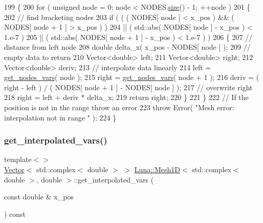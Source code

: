 \begin{DoxyCode}
199   \{
200     \textcolor{keywordflow}{for} ( \textcolor{keywordtype}{unsigned} node = 0; node < NODES.\hyperlink{classLuna_1_1Vector_ac9b6ed7a0df401728f27c193fbc8f4d8}{size}() - 1; ++node )
201     \{
202       \textcolor{comment}{// find bracketing nodes}
203       \textcolor{keywordflow}{if} ( ( ( NODES[ node ] < x\_pos ) && ( NODES[ node + 1 ] > x\_pos ) )
204               ||  ( std::abs( NODES[ node ] - x\_pos ) < 1.e-7  )
205               || ( std::abs( NODES[ node + 1 ] - x\_pos ) < 1.e-7 ) )
206       \{
207         \textcolor{comment}{// distance from left node}
208         \textcolor{keywordtype}{double} delta\_x( x\_pos - NODES[ node ] );
209         \textcolor{comment}{// empty data to return}
210         Vector<double> left;
211         Vector<double> right;
212         Vector<double> deriv;
213         \textcolor{comment}{// interpolate data linearly}
214         left = \hyperlink{classLuna_1_1Mesh1D_ac26360c5d246da376ebdcaa9fab05e81}{get\_nodes\_vars}( node );
215         right = \hyperlink{classLuna_1_1Mesh1D_ac26360c5d246da376ebdcaa9fab05e81}{get\_nodes\_vars}( node + 1 );
216         deriv = ( right - left ) / ( NODES[ node + 1 ] - NODES[ node ] );
217         \textcolor{comment}{// overwrite right}
218         right = left + deriv * delta\_x;
219         \textcolor{keywordflow}{return} right;
220       \}
221     \}
222     \textcolor{comment}{// If the position is not in the range throw an error}
223     \textcolor{keywordflow}{throw} Error( \textcolor{stringliteral}{"Mesh error: interpolation not in range "} );
224   \}
\end{DoxyCode}
\mbox{\label{classLuna_1_1Mesh1D_a82ec81e6e39128431ad6dfa752456313}} 
\subsubsection{\texorpdfstring{get\+\_\+interpolated\+\_\+vars()}{get\_interpolated\_vars()}\hspace{0.1cm}{\footnotesize\ttfamily [3/4]}}
{\footnotesize\ttfamily template$<$$>$ \\
\hyperlink{classLuna_1_1Vector}{Vector}$<$ std\+::complex$<$ double $>$ $>$ \hyperlink{classLuna_1_1Mesh1D}{Luna\+::\+Mesh1D}$<$ std\+::complex$<$ double $>$, double $>$\+::get\+\_\+interpolated\+\_\+vars (\begin{DoxyParamCaption}\item[{const double \&}]{x\+\_\+pos }\end{DoxyParamCaption}) const\hspace{0.3cm}{\ttfamily [inline]}}



